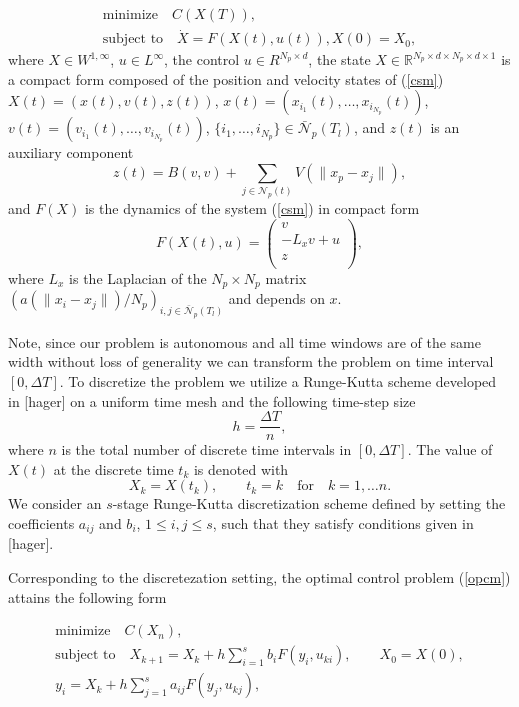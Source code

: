 \documentclass[a4paper,10pt, english]{article}
\newcommand{\D}{\displaystyle}
\begin{document}
 
 \begin{align}
 \D
 \mbox{minimize}\quad  C(X(T)),\\
  \mbox{subject to} \quad \dot{X} = F(X(t), u(t)),
  X(0) = X_0,
 \label{opcm}
 \end{align}
 where $X\in W^{1, \infty}$, $u\in L^{\infty}$, the control $u \in R^{N_p\times d}$,
 the state $X\in \mathbb{R}^{N_p \times d\times N_p\times d \times 1}$ is a compact form composed of the position and velocity 
states of (\ref{csm})   $X(t) = (x(t), v(t), z(t))$, $x(t) = (x_{i_1}(t), \dots, x_{i_{N_p}}(t))$,
 $v(t) = (v_{i_1}(t), \dots, v_{i_{N_p}}(t))$, $\{i_1, \dots, i_{N_p}\} \in \bar{\mathcal{N}}_p(T_l)$, 
 and $z(t)$ is an auxiliary component 
 $$
 z(t) = B(v, v) + \sum_{j\in \mathcal{N}_p(t)} V(\|x_p - x_j\|),
 $$
 and $F(X)$ is the dynamics of the system (\ref{csm}) in compact form
 $$
 F(X(t), u) =
  \left( 
  \begin{array}{c}
  v\\
   - L_xv + u\\
   z\\
 \end{array} 
 \right), 
 $$
 where $L_x$ is the Laplacian of the $N_p\times N_p$ matrix $(a(\|x_i - x_j\|)/N_p)_{i, j\in\bar{\mathcal{N}}_p(T_l)}$ and depends on $x$.
 
 
 Note, since our problem is autonomous and all time windows are of the same width without loss of generality
 we can transform the problem on time interval $[0, \Delta T]$. 
 To discretize the problem we utilize a Runge-Kutta scheme developed in [hager] on a uniform time mesh and the following time-step size
 \begin{equation}
   h = \frac{\Delta T}{n},
   \label{h}
 \end{equation}
 where $n$ is the total number of discrete time intervals in $[0, \Delta T]$.  The value of $X(t)$ at the discrete time $t_k$ is denoted with
 $$
 X_k = X(t_k), \qquad t_k = k \quad\mbox{for} \quad k = 1, \dots n.
 $$
 We consider an $s$-stage Runge-Kutta discretization scheme defined by setting the coefficients $a_{ij}$ and
 $b_{i}$, $1\leq i, j\leq s$, such that they satisfy conditions given in [hager].
 
 Corresponding to the discretezation setting, the optimal control problem (\ref{opcm})  attains the following form
 
 \begin{align}
  \D
  \mbox{minimize}\quad C(X_n),\\
   \mbox{subject to} \quad X_{k+1} = X_{k} + h\sum_{i=1}^{s}b_iF(y_i, u_{ki}), \qquad X_0 = X(0),\\
	y_i = X_k + h\sum_{j=1}^{s}a_{ij}F(y_j, u_{kj}),
  \label{opcmd}
  \end{align}
 
\end{document}
